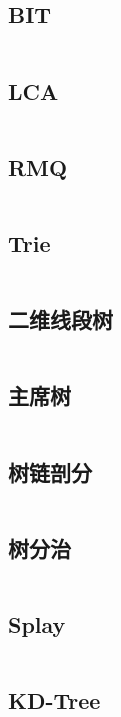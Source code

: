 \documentclass[titlepage,landscape,a4paper,10pt]{article}
\begin{document}
\begin{multicols}{2}
\begin{spacing}{0.8}
\subsection{BIT}
\inputminted{cpp}{DataStructure/BIT.cpp}

\subsection{LCA}
\inputminted{cpp}{DataStructure/LCA.cpp}

\subsection{RMQ}
\inputminted{cpp}{DataStructure/RMQ.cpp}

\subsection{Trie}
\inputminted{cpp}{DataStructure/trie.cpp}

\subsection{二维线段树}
\inputminted{cpp}{DataStructure/二维线段树.cpp}

\subsection{主席树}
\inputminted{cpp}{DataStructure/主席树.cpp}

\subsection{树链剖分}
\inputminted{cpp}{DataStructure/树链剖分.cpp}

\subsection{树分治}
\inputminted{cpp}{DataStructure/树分治.cpp}

\subsection{Splay}
\inputminted{cpp}{DataStructure/Splay.cpp}

\subsection{KD-Tree}
\inputminted{cpp}{DataStructure/KDT.cpp}


\end{spacing}
\end{multicols}
\end{document}
